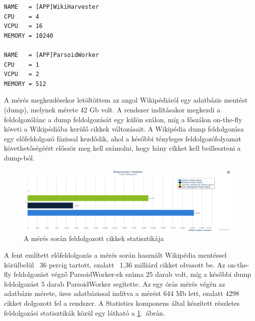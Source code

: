 \begin{lstlisting}[label={lst:opennebulatemplates}, caption=Részlet a használt VM-ek sablonjából,breaklines=true]
NAME   = [APP]WikiHarvester
CPU    = 4
VCPU   = 16
MEMORY = 10240

NAME   = [APP]ParsoidWorker
CPU    = 1
VCPU   = 2
MEMORY = 512
\end{lstlisting}

A mérés megkezdésekor letöltöttem az angol Wikipédiáról egy adatbázis mentést (dump), melynek mérete 42 Gb volt. A rendszer indításakor megkezdi a feldolgozólánc a dump feldolgozását egy külön szálon, míg a főszálon on-the-fly követi a Wikipédiába kerülő cikkek változásait. A Wikipédia dump feldolgozása egy előfeldolgozó fázissal kezdődik, ahol a későbbi tényleges feldolgozófolyamat követhetőségéért először meg kell számolni, hogy hány cikket kell beilleszteni a dump-ból. 

\begin{figure}[htp]
\centering
\includegraphics[scale=0.3]{img/storedarticles}
\caption{A mérés során feldolgozott cikkek statisztikája}
\label{fig:storedarticles}
\end{figure}

A fent említett előfeldolgozás a mérés során használt Wikipédia mentéssel körülbelül ~36 percig tartott, ezalatt ~1,36 milliárd cikket olvasott be. Az on-the-fly feldolgozást végző ParsoidWorker-ek száma 25 darab volt, míg a későbbi dump feldolgozást 5 darab ParsoidWorker segítette. Az egy órás mérés végén az adatbázis mérete, üres adatbázissal indítva a mérést 644 Mb lett, ezalatt 4298 cikket dolgozott fel a rendszer. A Statistics komponens által készített részletes feldolgozási statisztikák közül egy látható a \ref{fig:storedarticles}.~ábrán.

